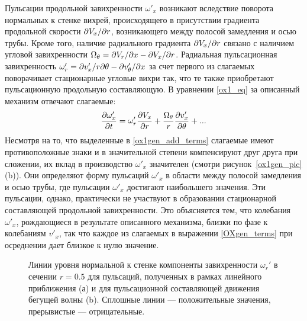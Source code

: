 Пульсации продольной завихренности $\omega'_x$ возникают вследствие поворота нормальных к стенке вихрей, происходящего в присутствии градиента продольной скорости $\partial V_x/ \partial r$, возникающего между полосой замедления и осью трубы. Кроме того, наличие радиального градиента $\partial V_x/ \partial r$ связано с наличием угловой завихренности $\Omega_\theta = \partial V_r / \partial x - \partial V_x / \partial r$. Радиальная пульсационная завихренность $\omega'_r = \partial v'_x / r \partial \theta - \partial v'_\theta / \partial x$ за счет первого из слагаемых поворачивает стационарные угловые вихри так, что те также приобретают пульсационную продольную составляющую. В уравнении \eqref{ox1_eq} за описанный механизм отвечают слагаемые:
\begin{equation}\label{ox1gen_add_terms}
\frac{\partial \omega'_x}{\partial t} = \omega'_r \frac {\partial V_x}{\partial r} + \frac{\Omega_\theta}{r} \frac{\partial v'_x}{\partial \theta} + ...
\end{equation}
Несмотря на то, что выделенные в \eqref{ox1gen_add_terms} слагаемые имеют противоположные знаки и в значительной степени компенсируют друг друга при сложении, их вклад в производство $\omega'_x$ значителен (смотри рисунок~\ref{ox1gen_pic}(b)). Они определяют форму пульсаций $\omega'_x$ в области между полосой замедления и осью трубы, где пульсации $\omega'_x$ достигают наибольшего значения. Эти пульсации, однако, практически не участвуют в образовании стационарной составляющей продольной завихренности. Это объясняется тем, что колебания $\omega'_x$, рождающиеся в результате описанного механизма, близки по фазе к колебаниям $v'_x$, так что каждое из слагаемых в выражении \eqref{OXgen_terms} при осреднении дает близкое к нулю значение.

\begin{figure}
\caption{Линии уровня нормальной к стенке компоненты завихренности $\omega_r'$ в сечении $r = 0.5$ для пульсаций, полученных в рамках линейного приближения (а) и для пульсационной составляющей движения бегущей волны (b). Сплошные линии --- положительные значения, прерывистые --- отрицательные.}
\label{pipetw_or1_pic}
\end{figure}

